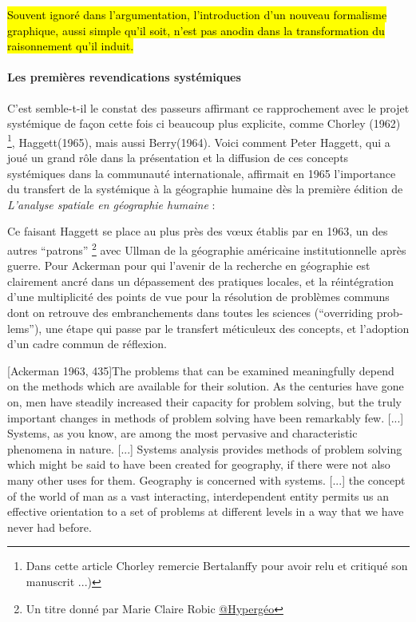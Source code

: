 \hl{Souvent ignoré dans l'argumentation, l'introduction d'un nouveau formalisme graphique, aussi simple qu'il soit, n'est pas anodin dans la transformation du raisonnement qu'il induit.}


\paragraph{Les premières revendications systémiques}

C'est semble-t-il le constat des passeurs affirmant ce rapprochement avec le projet systémique de façon cette fois ci beaucoup plus explicite, comme Chorley (1962) \footnote{Dans cette article Chorley remercie Bertalanffy pour avoir relu et critiqué son manuscrit ...)}, Haggett(1965), mais aussi Berry(1964). Voici comment Peter Haggett, qui a joué un grand rôle dans la présentation et la diffusion de ces concepts systémiques dans la communauté internationale, affirmait en 1965 l'importance du transfert de la systémique à la géographie humaine dès la première édition de \textit{L’analyse spatiale en géographie humaine} : 

Ce faisant Haggett se place au plus près des vœux établis par \textcite{Ackerman1963} en 1963, un des autres \enquote{patrons} \footnote{Un titre donné par Marie Claire Robic \href{http://www.hypergeo.eu/spip.php?article469}{@Hypergéo}} avec Ullman de la géographie américaine institutionnelle après guerre. Pour Ackerman pour qui l'avenir de la recherche en géographie est clairement ancré dans un dépassement des pratiques locales, et la réintégration d'une multiplicité des points de vue pour la résolution de problèmes communs dont on retrouve des embranchements dans toutes les sciences (\foreignquote{english}{overriding problems}), une étape qui passe par le transfert méticuleux des concepts, et l'adoption d'un cadre commun de réflexion.

[Ackerman 1963, 435]{The problems that can be examined meaningfully depend on the methods which are available for their solution. As the centuries have gone on, men have steadily increased their capacity for problem solving, but the truly important changes in methods of problem solving have been remarkably few. [...] Systems, as you know, are among the most pervasive and characteristic phenomena in nature. [...] Systems analysis provides methods of problem solving which might be said to have been created for geography, if there were not also many other uses for them. Geography is concerned with systems. [...] the concept of the world of man as a vast interacting, interdependent entity permits us an effective orientation to a set of problems at different levels in a way that we have never had before.}


